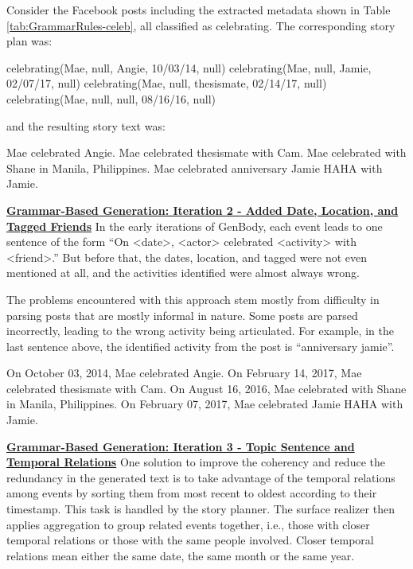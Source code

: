 Consider the Facebook posts including the extracted metadata shown in Table \ref{tab:GrammarRules-celeb}, all classified as celebrating. The corresponding story plan was:

\begin{center} celebrating(Mae, null, Angie, 10/03/14, null) \newline
	celebrating(Mae, null, Jamie, 02/07/17, null) \newline
	celebrating(Mae, null, thesismate, 02/14/17, null) \newline
	celebrating(Mae, null, null, 08/16/16, null) \end{center}

and the resulting story text was: 

\begin{center}Mae celebrated Angie. Mae celebrated thesismate with Cam. Mae celebrated with Shane in Manila, Philippines. Mae celebrated anniversary Jamie HAHA with Jamie. \end{center}

\underline{\textbf{Grammar-Based Generation: Iteration 2 - Added Date, Location, and Tagged Friends}} \newline
In the early iterations of GenBody, each event leads to one sentence of the form ``On <date>, <actor> celebrated <activity> with <friend>.” But before that, the dates, location, and tagged were not even mentioned at all, and the activities identified were almost always wrong.

The problems encountered with this approach stem mostly from difficulty in parsing posts that are mostly informal in nature. Some posts are parsed incorrectly, leading to the wrong activity being articulated. For example, in the last sentence above, the identified activity from the post is ``anniversary jamie”.

\begin{center} On October 03, 2014, Mae celebrated Angie. On February 14, 2017, Mae celebrated thesismate with Cam. On August 16, 2016, Mae celebrated with Shane in Manila, Philippines. On February 07, 2017, Mae celebrated Jamie HAHA with Jamie. \end{center}

\underline{\textbf{Grammar-Based Generation: Iteration 3 - Topic Sentence and Temporal Relations}} \newline
One solution to improve the coherency and reduce the redundancy in the generated text is to take advantage of the temporal relations among events by sorting them from most recent to oldest according to their timestamp. This task is handled by the story planner. The surface realizer then applies aggregation to group related events together, i.e., those with closer temporal relations or those with the same people involved. Closer temporal relations mean either the same date, the same month or the same year.

